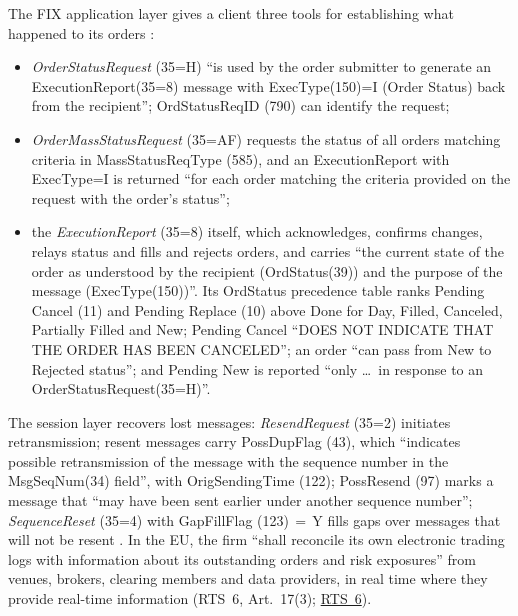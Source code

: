 \begin{qfmechanism}\label{mech:order-state-reconciliation}
 The FIX application layer gives a client three tools for establishing what happened to its orders \citep[FIX Latest, EP312, Orchestra repository of 8 September 2026]{s6-fix}:
\begin{itemize}
\item \emph{OrderStatusRequest} (35=H) ``is used by the order submitter to generate an ExecutionReport(35=8) message with ExecType(150)=I (Order Status) back from the recipient''; OrdStatusReqID (790) can identify the request;
\item \emph{OrderMassStatusRequest} (35=AF) requests the status of all orders matching criteria in MassStatusReqType (585), and an ExecutionReport with ExecType=I is returned ``for each order matching the criteria provided on the request with the order's status'';
\item the \emph{ExecutionReport} (35=8) itself, which acknowledges, confirms changes, relays status and fills and rejects orders, and carries ``the current state of the order as understood by the recipient (OrdStatus(39)) and the purpose of the message (ExecType(150))''. Its OrdStatus precedence table ranks Pending Cancel (11) and Pending Replace (10) above Done for Day, Filled, Canceled, Partially Filled and New; Pending Cancel ``DOES NOT INDICATE THAT THE ORDER HAS BEEN CANCELED''; an order ``can pass from New to Rejected status''; and Pending New is reported ``only \dots\ in response to an OrderStatusRequest(35=H)''.
\end{itemize}
The session layer recovers lost messages: \emph{ResendRequest} (35=2) initiates retransmission; resent messages carry PossDupFlag (43), which ``indicates possible retransmission of the message with the sequence number in the MsgSeqNum(34) field'', with OrigSendingTime (122); PossResend (97) marks a message that ``may have been sent earlier under another sequence number''; \emph{SequenceReset} (35=4) with GapFillFlag (123)\,$=$\,Y fills gaps over messages that will not be resent \citep[FIXT session layer, Orchestra file FIX.5.0SP2\_EP247 of 16 May 2019]{s6-fix}. In the EU, the firm ``shall reconcile its own electronic trading logs with information about its outstanding orders and risk exposures'' from venues, brokers, clearing members and data providers, in real time where they provide real-time information (RTS~6, Art.~17(3); \hyperref[rule:mifid-rts6-algorithmic-controls]{RTS~6}).


\end{qfmechanism}
